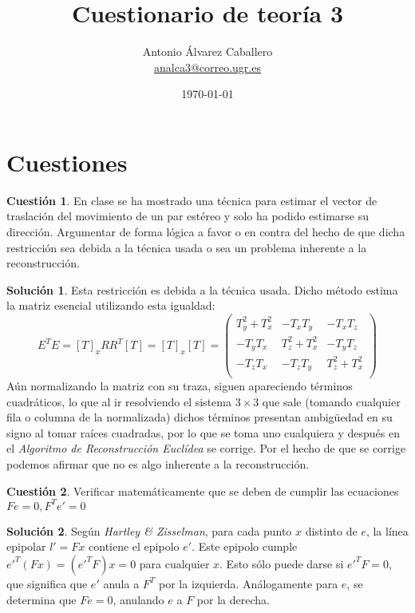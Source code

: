 \documentclass[a4paper, 11pt]{article}
\title{Cuestionario de teoría 3}
\author{Antonio Álvarez Caballero\\
    \href{mailto:analca3@correo.ugr.es}{analca3@correo.ugr.es}}
\date{\today}
\theoremstyle{definition}
\newtheorem{cuestion}{Cuestión}
\newtheorem*{solucion}{Solución}
\begin{document}
  \maketitle

  \section{Cuestiones}

  \begin{cuestion}
    En clase se ha mostrado una técnica para estimar el vector de traslación del movimiento de
    un par estéreo y solo ha podido estimarse su dirección. Argumentar de forma lógica a favor o
    en contra del hecho de que dicha restricción sea debida a la técnica usada o sea un problema
    inherente a la reconstrucción.
  \end{cuestion}

  \begin{solucion}
    Esta restricción es debida a la técnica usada. Dicho método estima la matriz
    esencial utilizando esta igualdad:
    \[ E^T E = [T]_x R R^T [T] = [T]_x [T] = \left(
    \begin{array}{ccc}
        T_y^2 + T_x^2 & -T_xT_y & -T_xT_z \\
        -T_yT_x & T_z^2 + T_x^2 & -T_yT_z \\
        -T_zT_x & -T_zT_y & T_z^2 + T_x^2 \\
    \end{array}
    \right) \]
    Aún normalizando la matriz con su traza, siguen apareciendo términos cuadráticos,
    lo que al ir resolviendo el sistema $3\times3$ que sale (tomando cualquier fila o columna de la normalizada)
    dichos términos presentan ambigüedad en su signo al tomar raíces cuadradas, por
    lo que se toma uno cualquiera y después en el \textit{Algoritmo de Reconstrucción Euclídea}
    se corrige. Por el hecho de que se corrige podemos afirmar que no es algo inherente a la reconstrucción.
  \end{solucion}

  \begin{cuestion}
    Verificar matemáticamente que se deben de cumplir las ecuaciones $Fe = 0, F^Te'= 0$

  \end{cuestion}

  \begin{solucion} %
    Según \emph{Hartley \& Zisselman}, para cada punto $x$ distinto de $e$, la línea
    epipolar $l'=Fx$ contiene el epipolo $e'$. Este epipolo cumple $e'^T(Fx)=(e'^TF)x=0$
    para cualquier $x$. Esto sólo puede darse si $e'^TF=0$, que significa que $e'$
    anula a $F^T$ por la izquierda. Análogamente para $e$, se determina que $Fe=0$,
    anulando $e$ a $F$ por la derecha.
  \end{solucion}
\end{document}
